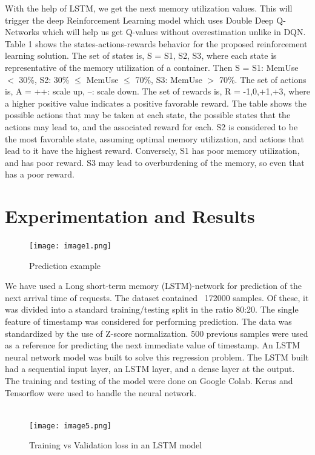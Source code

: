 \documentclass[conference]{IEEEtran}
\begin{document}
With the help of LSTM, we get the next memory utilization values. This will trigger the deep Reinforcement Learning model which uses Double Deep Q-Networks which will help us get Q-values without overestimation unlike in DQN. Table 1 shows the states-actions-rewards behavior for the proposed reinforcement learning solution. The set of states is, S = {S1, S2, S3}, where each state is representative of the memory utilization of a container. Then S = {S1: MemUse $<$ 30\%, S2: 30\% $\leq$ MemUse $\leq$ 70\%, S3: MemUse $>$ 70\%}. The set of actions is, A = {++: scale up, --: scale down}. The set of rewards is, R = {-1,0,+1,+3}, where a higher positive value indicates a positive favorable reward. The table shows the possible actions that may be taken at each state, the possible states that the actions may lead to, and the associated reward for each. S2 is considered to be the most favorable state, assuming optimal memory utilization, and actions that lead to it have the highest reward. Conversely, S1 has poor memory utilization, and has poor reward. S3 may lead to overburdening of the memory, so even that has a poor reward. \\

\section*{Experimentation and Results}

\begin{figure}[htbp]
\centerline{\texttt{[image: image1.png]}}
\caption{Prediction example}
\label{fig}
\end{figure}

We have used a Long short-term memory (LSTM)-network for prediction of the next arrival time of requests. The dataset contained ~172000 samples. Of these, it was divided into a standard training/testing split in the ratio 80:20. The single feature of timestamp was considered for performing prediction. The data was standardized by the use of Z-score normalization. 500 previous samples were used as a reference for predicting the next immediate value of timestamp. An LSTM neural network model was built to solve this regression problem. The LSTM built had a sequential input layer, an LSTM layer, and a dense layer at the output. The training and testing of the model were done on Google Colab. Keras and Tensorflow were used to handle the neural network. \\
\\
\begin{figure}[htbp]
\centerline{\texttt{[image: image5.png]}}
\caption{Training vs Validation loss in an LSTM model}
\label{fig}
\end{figure}
\end{document}
